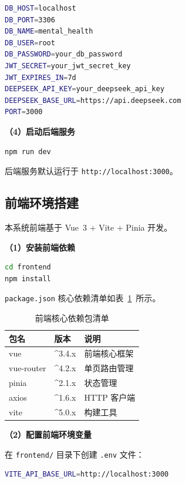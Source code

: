 \begin{lstlisting}[language=bash, caption={后端 .env 配置示例}]
DB_HOST=localhost
DB_PORT=3306
DB_NAME=mental_health
DB_USER=root
DB_PASSWORD=your_db_password
JWT_SECRET=your_jwt_secret_key
JWT_EXPIRES_IN=7d
DEEPSEEK_API_KEY=your_deepseek_api_key
DEEPSEEK_BASE_URL=https://api.deepseek.com
PORT=3000
\end{lstlisting}

\textbf{（4）启动后端服务}

\begin{lstlisting}[language=bash, caption={启动后端开发服务器}]
npm run dev
\end{lstlisting}

后端服务默认运行于 \texttt{http://localhost:3000}。


\subsection{前端环境搭建}

本系统前端基于 Vue~3 + Vite + Pinia 开发。

\textbf{（1）安装前端依赖}

\begin{lstlisting}[language=bash, caption={安装前端依赖包}]
cd frontend
npm install
\end{lstlisting}

\texttt{package.json} 核心依赖清单如表~\ref{tab:A-2}~所示。

\begin{table}[H]
    \centering
    \caption{前端核心依赖包清单}
    \label{tab:A-2}
    \begin{tabular}{lll}
        \hline
        包名 & 版本 & 说明 \\
        \hline
        vue & \^{}3.4.x & 前端核心框架 \\
        vue-router & \^{}4.2.x & 单页路由管理 \\
        pinia & \^{}2.1.x & 状态管理 \\
        axios & \^{}1.6.x & HTTP 客户端 \\
        vite & \^{}5.0.x & 构建工具 \\
        \hline
    \end{tabular}
\end{table}

\textbf{（2）配置前端环境变量}

在 \texttt{frontend/} 目录下创建 \texttt{.env} 文件：

\begin{lstlisting}[language=bash, caption={前端 .env 配置}]
VITE_API_BASE_URL=http://localhost:3000
\end{lstlisting}

